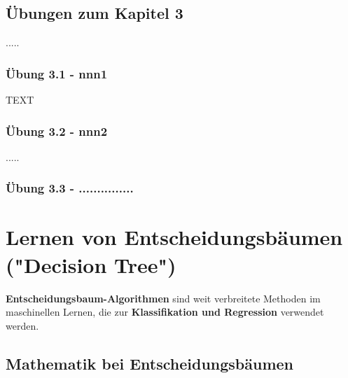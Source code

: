 \documentclass[12pt]{article}
\begin{document}
\subsection{Übungen zum Kapitel 3}
.....\\
\subsubsection{Übung 3.1 - nnn1}
TEXT\\
\subsubsection{Übung 3.2 - nnn2}
.....\\
\subsubsection{Übung 3.3 - ...............}


\newpage

\section{Lernen von Entscheidungsbäumen ("Decision Tree")\\}


\textbf{Entscheidungsbaum-Algorithmen} sind weit verbreitete Methoden im maschinellen Lernen, die zur \textbf{Klassifikation und Regression} verwendet werden.\\

\subsection{Mathematik bei Entscheidungsbäumen}
\end{document}
